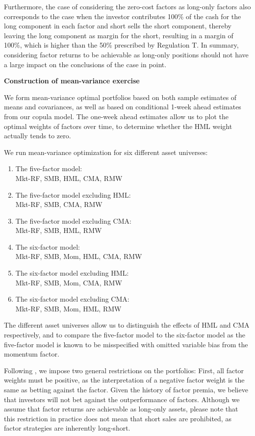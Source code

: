 Furthermore, the case of considering the zero-cost factors as long-only factors also corresponds to the case when the investor contributes 100\% of the cash for the long component in each factor and short sells the short component, thereby leaving the long component as margin for the short, resulting in a margin of 100\%, which is higher than the 50\% prescribed by Regulation T. In summary, considering factor returns to be achievable as long-only positions should not have a large impact on the conclusions of the case in point.

\textbf{Construction of mean-variance exercise}

We form mean-variance optimal portfolios based on both sample estimates of means and covariances, as well as based on conditional 1-week ahead estimates from our copula model. The one-week ahead estimates allow us to plot the optimal weights of factors over time, to determine whether the HML weight actually tends to zero.

We run mean-variance optimization for six different asset universes:
\begin{enumerate}[{(1)}]
	\item The five-factor model: \\
	Mkt-RF, SMB, HML, CMA, RMW
	\item The five-factor model excluding HML: \\
	Mkt-RF, SMB, CMA, RMW
	\item The five-factor model excluding CMA: \\
	Mkt-RF, SMB, HML, RMW
	\item The six-factor model: \\
	Mkt-RF, SMB, Mom, HML, CMA, RMW
	\item The six-factor model excluding HML: \\
	Mkt-RF, SMB, Mom, CMA, RMW
	\item The six-factor model excluding CMA: \\
	Mkt-RF, SMB, Mom, HML, RMW
\end{enumerate}

The different asset universes allow us to distinguish the effects of HML and CMA respectively, and to compare the five-factor model to the six-factor model as the five-factor model is known to be misspecified with omitted variable bias from the momentum factor.

Following \textcite{ChristoffersenLanglois2013}, we impose two general restrictions on the portfolios: First, all factor weights must be positive, as the interpretation of a negative factor weight is the same as betting against the factor. Given the history of factor premia, we believe that investors will not bet against the outperformance of factors. Although we assume that factor returns are achievable as long-only assets, please note that this restriction in practice does not mean that short sales are prohibited, as factor strategies are inherently long-short. 

